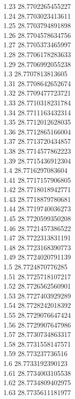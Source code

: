 {1.23	28.7702265455227\\
1.24	28.7703023413611\\
1.25	28.7703794891898\\
1.26	28.7704578634756\\
1.27	28.7705373465997\\
1.28	28.7706178283633\\
1.29	28.7706992055238\\
1.3	28.7707813813605\\
1.31	28.7708642652674\\
1.32	28.7709477723721\\
1.33	28.7710318231784\\
1.34	28.7711163432314\\
1.35	28.7712012628035\\
1.36	28.7712865166004\\
1.37	28.7713720434857\\
1.38	28.7714577862223\\
1.39	28.7715436912304\\
1.4	28.7716297083604\\
1.41	28.7717157906805\\
1.42	28.7718018942771\\
1.43	28.7718879780681\\
1.44	28.7719740036273\\
1.45	28.7720599350208\\
1.46	28.7721457386522\\
1.47	28.7722313831191\\
1.48	28.7723168390773\\
1.49	28.7724020791139\\
1.5	28.7724870776285\\
1.51	28.7725718107217\\
1.52	28.7726562560901\\
1.53	28.7727403929289\\
1.54	28.7728242018392\\
1.55	28.7729076647424\\
1.56	28.7729907647986\\
1.57	28.7730734863317\\
1.58	28.7731558147571\\
1.59	28.773237736516\\
1.6	28.7733192390123\\
1.61	28.7734003105538\\
1.62	28.7734809402975\\
1.63	28.7735611181977\\
}
